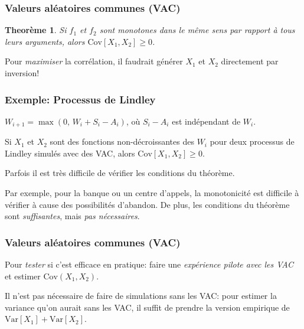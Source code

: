 \documentclass[t,usepdftitle=false]{beamer}
\def\Var{\mbox{Var}}
\def\Cov{\mbox{Cov}}
\newtheorem{thm}{Theorème}
\begin{document}
\begin{frame}
\frametitle{Valeurs aléatoires communes (VAC)}

\begin{thm}
Si $f_1$ et $f_2$ sont monotones dans le m\^eme sens par rapport \`a
tous leurs arguments, alors  $\Cov[X_1, X_2] \ge 0$.
\end{thm}

\mbox{}

Pour \emph{maximiser} la corrélation, il faudrait générer
$X_1$ et $X_2$ directement par inversion!

\end{frame}

\begin{frame}
\frametitle{Exemple: Processus de Lindley}

${W_{i+1}} = \max(0,\, W_i + S_i - A_i)$, o\`u $S_i-A_i$ est
indépendant de $W_i$.

\mbox{}

Si ${X_1}$ et ${X_2}$ sont des fonctions non-décroissantes des $W_i$
pour deux processus de Lindley simulés avec des VAC, 
alors $\Cov[X_1, X_2] \ge 0$.

\mbox{}

Parfois il est très difficile de vérifier les conditions du
théorème.

\mbox{}

Par exemple, pour la banque ou un centre d'appels, la monotonicité
est difficile \`a vérifier \`a cause des possibilités d'abandon.
De plus, les conditions du théorème sont \emph{suffisantes}, mais 
\emph{pas nécessaires}.

\end{frame}

\begin{frame}
\frametitle{Valeurs aléatoires communes (VAC)}

Pour \emph{tester} si c'est efficace en pratique:
faire une \emph{expérience pilote avec les VAC} et estimer 
$\Cov(X_1, X_2)$.

\mbox{}

Il n'est pas nécessaire de faire de simulations sans les VAC:
pour estimer la variance qu'on aurait sans les VAC,
il suffit de prendre la version empirique de $\Var[X_1] + \Var[X_2]$.

\end{frame}
\end{document}
